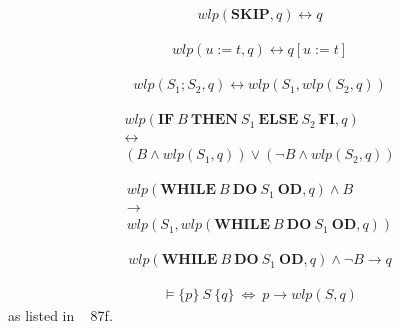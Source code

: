 \begin{equation}\label{eq:prove_wlp_skip}
\begin{gathered}
	wlp(\mathbf{SKIP},q)\leftrightarrow q
\end{gathered}
\end{equation}

\begin{equation}\label{eq:prove_wlp_assign}
\begin{gathered}
	wlp(u:=t,q)\leftrightarrow q[u:=t]
\end{gathered}
\end{equation}

\begin{equation}\label{eq:prove_wlp_comp}
\begin{gathered}
	wlp(S_1;S_2,q)\leftrightarrow wlp(S_1,wlp(S_2,q))
\end{gathered}
\end{equation}

\begin{equation}\label{eq:prove_wlp_alt}
\begin{gathered}
	wlp(\mathbf{IF}\ B\ \mathbf{THEN}\ S_1\ \mathbf{ELSE}\ S_2\ \mathbf{FI},q) \\
	\leftrightarrow \\
	(B\land wlp(S_1,q))\lor (\lnot B\land wlp(S_2,q))
\end{gathered}
\end{equation}

\begin{equation}\label{eq:prove_wlp_loop_pre}
\begin{gathered}
	wlp(\mathbf{WHILE}\ B\ \mathbf{DO}\ S_1\ \mathbf{OD},q)\land B \\
	\to \\
	wlp(S_1,wlp(\mathbf{WHILE}\ B\ \mathbf{DO}\ S_1\ \mathbf{OD},q))
\end{gathered}
\end{equation}

\begin{equation}\label{eq:prove_wlp_loop_post}
\begin{gathered}
	wlp(\mathbf{WHILE}\ B\ \mathbf{DO}\ S_1\ \mathbf{OD},q)\land \lnot B\to q
\end{gathered}
\end{equation}

\begin{equation}\label{eq:prove_wlp_conseq}
\begin{gathered}
	\models\{p\}\ S\ \{q\}\ \iff\ p\to wlp(S,q)
\end{gathered}
\end{equation}
as listed in ~\cite{apt2010verification} 87f.


